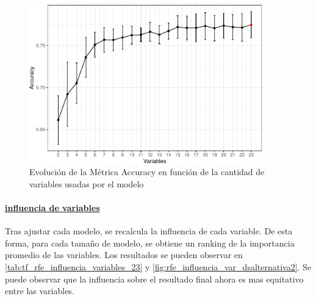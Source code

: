 \begin{figure}[!htb]
	\centering
	\includegraphics[width=0.9\textwidth]{imagenes/variables/rfe_evolucion_accuracy-1_alternativa2.pdf}
	\caption{Evolución de la Métrica Accuracy en función de la cantidad de variables usadas por el modelo}
	\label{fig:rfe_evolucion_accuracy_datasetAlternativa2}
\end{figure}

\paragraph{\underline{influencia de variables}}
Tras ajustar cada modelo, se recalcula la influencia de cada variable.
De esta forma, para cada tamaño de modelo, se obtiene un ranking de la
importancia promedio de las variables. Los resultados se pueden observar en \ref{tab:tf_rfe_influencia_variables_23} y \ref{fig:rfe_influencia_var_dsalternativa2}. Se puede observar que la influencia sobre el resultado final ahora es mas equitativo entre las variables.


